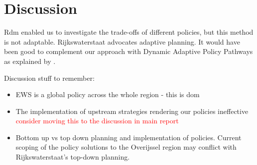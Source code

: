 \section{Discussion}
\label{s:discussion}




Rdm enabled us to investigate the trade-offs of different policies, but this method is not adaptable. Rijkswaterstaat advocates adaptive planning. It would have been good to complement our approach with Dynamic Adaptive Policy Pathways as explained by \cite{kwakkel_coping_2016}.

Discussion stuff to remember:
\begin{itemize}
    \item EWS is a global policy across the whole region - this is dom
    \item The implementation of upstream strategies rendering our policies ineffective \textcolor{red}{consider moving this to the discussion in main report}
    \item Bottom up vs top down planning and implementation of policies. Current scoping of the policy solutions to the Overijssel region may conflict with Rijkswaterstaat's top-down planning.
\end{itemize}